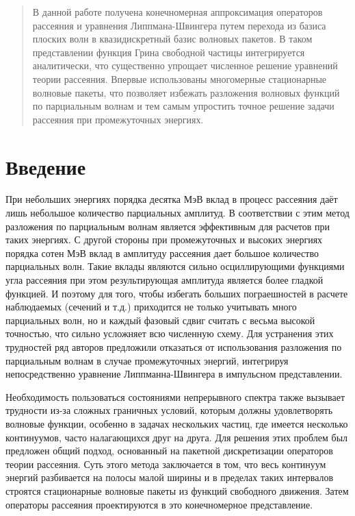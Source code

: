 \documentclass[a4paper,12pt]{article}
\begin{document}
	\tableofcontents
    \pagebreak
     
	\begin{abstract}
		В данной работе получена конечномерная аппроксимация операторов рассеяния и уравнения Липпмана-Швингера путем перехода из базиса плоских волн в квазидискретный базис волновых пакетов. В таком представлении функция Грина свободной частицы интегрируется аналитически, что существенно упрощает численное решение уравнений теории рассеяния. Впервые использованы многомерные стационарные волновые пакеты, что позволяет избежать разложения волновых функций по парциальным волнам и тем самым упростить точное решение задачи рассеяния при промежуточных энергиях.
	\end{abstract}
	\pagebreak

	\section{Введение}
При небольших энергиях порядка десятка МэВ вклад в процесс рассеяния даёт лишь небольшое количество парциальных амплитуд. В соответствии с этим метод разложения по парциальным волнам является эффективным для расчетов при таких энергиях. С другой стороны при промежуточных и высоких энергиях порядка сотен МэВ вклад в амплитуду рассеяния дает большое количество парциальных волн. Такие вклады являются сильно осциллирующими функциями угла рассеяния при этом результирующая амплитуда является более гладкой функцией. И поэтому для того, чтобы избегать больших пограешностей в расчете наблюдаемых (сечений и т.д.) приходится не только учитывать много парциальных волн, но и каждый фазовый сдвиг считать с весьма высокой точностью, что сильно усложняет всю численную схему. Для устранения этих трудностей ряд авторов предложили отказаться от использования разложения по парциальным волнам в случае промежуточных энергий, интегрируя непосредственно уравнение Липпманна-Швингера в импульсном представлении\cite{elster}.

Необходимость пользоваться состояниями непрерывного спектра также вызывает трудности из-за сложных граничных условий, которым должны удовлетворять волновые функции, особенно в задачах нескольких частиц, где имеется несколько континуумов, часто налагающихся друг на друга. Для решения этих проблем был предложен общий подход\cite{kuku2}\cite{kuku1}, основанный на пакетной  дискретизации операторов теории рассеяния. Суть этого метода заключается в том, что весь континуум энергий разбивается на полосы малой ширины и в пределах таких интервалов строятся стационарные волновые пакеты из функций свободного движения. Затем операторы рассеяния проектируются в это конечномерное представление.
\end{document}

